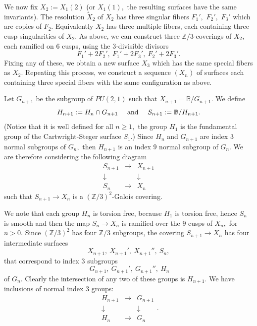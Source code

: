 \documentclass[10pt,a4paper]{article}
\newcommand{\ZZ}{\mathbb{Z}}
\newcommand{\BB}{\mathbb{B}}
\begin{document}
We now fix $X_2:=X_1(2)$ (or $X_1(1),$ the resulting surfaces have the same invariants).
The resolution $\tilde X_2$ of $X_2$ has three singular fibers $F_1',$ $F_2',$ $F_3'$ which are copies of $F_2.$
Equivalently $X_2$ has three multiple fibers, each containing three cusp singularities of $X_2.$
As above, we can construct three
$\ZZ/3$-coverings of $X_{2},$ each ramified on $6$ cusps, using the $3$-divisible divisors
\[
F_1'+2F_2',\ F_1'+2F_3',\ F_2'+2F_3'.
\]
Fixing any of these, we obtain a new surface $X_{3}$
which has the same special fibers as $X_{2}.$ Repeating this process,
we construct a sequence $(X_{n})$ of surfaces each
containing three special fibers with the same configuration as above.

Let $G_{n+1}$ be the subgroup of $PU(2,1)$ such that $X_{n+1}=\BB/G_{n+1}.$
We define
\[
H_{n+1}:=H_{n}\cap G_{n+1}\ \ \ \ {\rm and}\ \ \ \ S_{n+1}:=\BB/H_{n+1}.
\]
(Notice that it is well defined for all $n\geq 1,$ the group $H_1$ is the fundamental group of the Cartwright-Steger surface $S_1.$)
Since $H_{n}$ and $G_{n+1}$ are index $3$ normal subgroups of $G_n,$ then $H_{n+1}$ is an index $9$ normal subgroup of $G_n.$
We are therefore considering the following diagram
\begin{equation}\label{eq:diagram galois cover}
\begin{array}{ccc}
S_{n+1} & \longrightarrow & X_{n+1}\\
\downarrow &  & \downarrow\\
S_{n} & \longrightarrow & X_{n}
\end{array}
\end{equation}
such that $S_{n+1}\to X_n$ is a $(\ZZ/3)^2$-Galois covering.

We note that each group $H_n$ is torsion free, because $H_1$ is torsion free, hence
$S_n$ is smooth and then the map $S_n\to X_n$ is ramified over the $9$ cusps of $X_n,$ for $n>0.$
Since $(\ZZ/3)^2$ has four $\ZZ/3$ subgroups, the covering $S_{n+1}\to X_n$ has four intermediate surfaces
\[
X_{n+1},\ X_{n+1}',\ X_{n+1}'',\ S_n,
\]
that correspond to index $3$ subgroups
\[
\ G_{n+1},\ G_{n+1}',\ G_{n+1}'',\ H_{n}
\]
of $G_n.$
Clearly the intersection of any two of these groups is $H_{n+1}.$
We have inclusions of normal index $3$ groups:
\[
\begin{array}{ccc}
H_{n+1} & \longrightarrow & G_{n+1}\\
\downarrow &  & \downarrow\\
H_{n} & \longrightarrow & G_{n}
\end{array}.
\]
\end{document}

